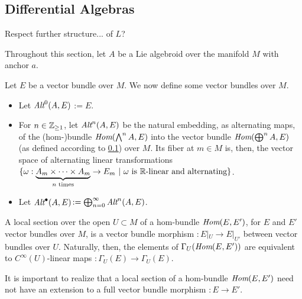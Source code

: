 \subsection{Differential Algebras}

{\color{gray}

Respect further structure... of $L$?

}

\linea 

Throughout this section, let $A$ be a Lie algebroid over the manifold $M$ with anchor $a$.

\begin{definition}
Let $E$ be a vector bundle over $M$. We now define some vector bundles over $M$.
    \begin{itemize}
    
    \item Let \emph{$\operatorname{\textit{Alt}}^0(A, E)$}$:= E$. 
    
    \item For $n \in \mathbb{Z}_{\geq 1}$, let \emph{$\operatorname{\textit{Alt}}^n(A, E)$} be the natural embedding, as alternating maps, of the (hom-)bundle $\operatorname{\textit{Hom}}(\bigwedge^n A, E)$ into the vector bundle $\operatorname{\textit{Hom}}(\bigoplus^n A, E)$ (as defined according to \ref{}) over $M$. Its fiber at $m \in M$ is, then, the vector space of alternating linear transformations $\{\omega: \underbrace{A_m \times \cdots \times A_m}_{\text{$n$ times}} \to E_m \ |\  \text{$\omega$ is $\mathbb{R}$-linear and alternating}\}$.
    
    \item Let \emph{$\operatorname{\textit{Alt}}^\bullet(A, E)$}$:= \bigoplus^\infty_{n = 0} \operatorname{\textit{Alt}}^n(A, E)$.
    
        
    \end{itemize}
    
\end{definition}

\begin{remark}
A local section over the open $U \subset M$ of a hom-bundle $\operatorname{\textit{Hom}}(E, E')$, for $E$ and $E'$ vector bundles over $M$, is a vector bundle morphism $:E|_U \to E|_{U'}$ between vector bundles over $U$. Naturally, then, the elements of $\Gamma_U(\operatorname{\textit{Hom}}(E, E'))$ are equivalent to $C^\infty(U)$-linear maps $: \Gamma_U(E) \to \Gamma_U(E)$. 

It is important to realize that a local section of a hom-bundle $\operatorname{\textit{Hom}}(E, E')$ need not have an extension to a full vector bundle morphism $:E \to E'$.
\end{remark}

